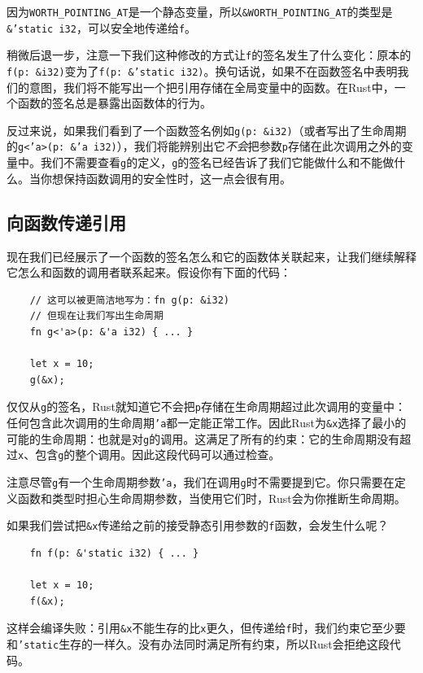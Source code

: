 因为\texttt{WORTH\_POINTING\_AT}是一个静态变量，所以\texttt{\&WORTH\_POINTING\_AT}的类型是\texttt{\&'static i32}，可以安全地传递给\texttt{f}。

稍微后退一步，注意一下我们这种修改的方式让\texttt{f}的签名发生了什么变化：原本的\texttt{f(p: \&i32)}变为了\texttt{f(p: \&'static i32)}。换句话说，如果不在函数签名中表明我们的意图，我们将不能写出一个把引用存储在全局变量中的函数。在Rust中，一个函数的签名总是暴露出函数体的行为。

反过来说，如果我们看到了一个函数签名例如\texttt{g(p: \&i32)}（或者写出了生命周期的\texttt{g<'a>(p: \&'a i32)}），我们将能辨别出它\emph{不会}把参数\texttt{p}存储在此次调用之外的变量中。我们不需要查看\texttt{g}的定义，\texttt{g}的签名已经告诉了我们它能做什么和不能做什么。当你想保持函数调用的安全性时，这一点会很有用。

\subsection{向函数传递引用}
现在我们已经展示了一个函数的签名怎么和它的函数体关联起来，让我们继续解释它怎么和函数的调用者联系起来。假设你有下面的代码：
\begin{verbatim}
    // 这可以被更简洁地写为：fn g(p: &i32)
    // 但现在让我们写出生命周期
    fn g<'a>(p: &'a i32) { ... }

    let x = 10;
    g(&x);
\end{verbatim}

仅仅从\texttt{g}的签名，Rust就知道它不会把\texttt{p}存储在生命周期超过此次调用的变量中：任何包含此次调用的生命周期\texttt{'a}都一定能正常工作。因此Rust为\texttt{\&x}选择了最小的可能的生命周期：也就是对\texttt{g}的调用。这满足了所有的约束：它的生命周期没有超过\texttt{x}、包含\texttt{g}的整个调用。因此这段代码可以通过检查。

注意尽管\texttt{g}有一个生命周期参数\texttt{'a}，我们在调用\texttt{g}时不需要提到它。你只需要在定义函数和类型时担心生命周期参数，当使用它们时，Rust会为你推断生命周期。

如果我们尝试把\texttt{\&x}传递给之前的接受静态引用参数的\texttt{f}函数，会发生什么呢？
\begin{verbatim}
    fn f(p: &'static i32) { ... }

    let x = 10;
    f(&x);
\end{verbatim}

这样会编译失败：引用\texttt{\&x}不能生存的比\texttt{x}更久，但传递给\texttt{f}时，我们约束它至少要和\texttt{'static}生存的一样久。没有办法同时满足所有约束，所以Rust会拒绝这段代码。


